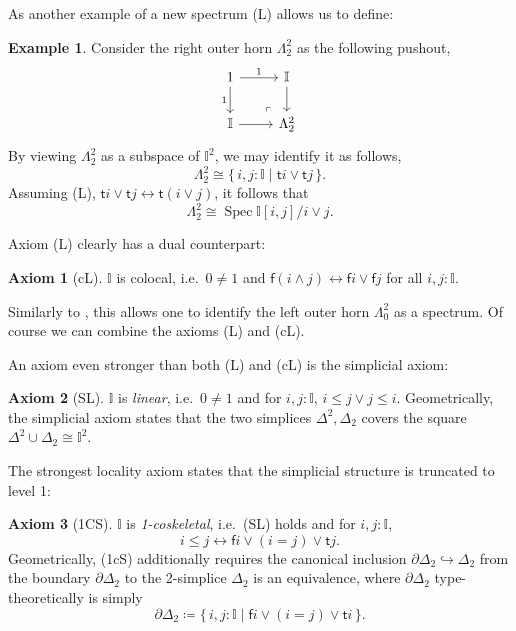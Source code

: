 \documentclass[12pt]{amsart}
\theoremstyle{definition}
\newtheorem{example}[theorem]{Example}
\newtheorem*{axiom}{Axiom}
\newcommand{\mbb}[1]{\mathbb{#1}}
\newcommand{\I}{\mbb I}
\newcommand{\ms}[1]{\mathsf{#1}}
\newcommand{\scomp}[2]{\{\,#1\mid#2\,\}}
\newcommand{\hook}{\hookrightarrow}
\newcommand{\eq}{\leftrightarrow}
\newcommand{\spec}{\operatorname{Spec}}
\begin{document}
As another example of a new spectrum (L) allows us to define:

\begin{example}\label{exm:hornaffine}
  Consider the right outer horn $\Lambda^2_2$ as the following pushout,
  \[
    \begin{tikzcd}
      1 \ar[d, "1"'] \ar[r, "1"] & \I \ar[d] \\
      \I \ar[r] & \Lambda^2_2
      \arrow["\lrcorner"{anchor=center, pos=0.125, rotate=180}, draw=none, from=2-2, to=1-1]
    \end{tikzcd}
  \]
  By viewing $\Lambda^2_2$ as a subspace of $\I^2$, we may identify it as follows,
  \[ \Lambda^2_2 \cong \scomp{i,j : \I}{\ms ti \vee \ms tj}. \]
  Assuming (L), $\ms ti \vee \ms tj \eq \ms t(i\vee j)$, it follows that 
  \[ \Lambda^2_2 \cong \spec \I[i,j]/i \vee j. \]
\end{example}

Axiom (L) clearly has a dual counterpart:

\begin{axiom}[cL]\label{ax:cL}
  $\I$ is colocal, i.e.\ $0 \neq 1$ and $\ms f(i \wedge j) \eq \ms fi \vee \ms fj$ for all $i,j : \I$.
\end{axiom}

Similarly to , this allows one to identify the left outer horn $\Lambda^2_0$ as a spectrum. Of course we can combine the axioms (L) and (cL). 

An axiom even stronger than both (L) and (cL) is the simplicial axiom:

\begin{axiom}[SL]\label{ax:SL}
  $\I$ is \emph{linear}, i.e.\ $0 \neq 1$ and for $i,j : \I$, $i \le j \vee j \le i$. Geometrically, the simplicial axiom states that the two simplices $\Delta^2,\Delta_2$ covers the square $\Delta^2 \cup \Delta_2 \cong \I^2$.
\end{axiom}

The strongest locality axiom states that the simplicial structure is truncated to level 1:

\begin{axiom}[1CS]\label{ax:1cS}
  $\I$ is \emph{1-coskeletal}, i.e.\ (SL) holds and for $i,j : \I$, 
  \[ i \le j \eq \ms fi \vee (i = j)\vee \ms tj. \]
  Geometrically, (1cS) additionally requires the canonical inclusion $\partial\Delta_2 \hook \Delta_2$ from the boundary $\partial\Delta_2$ to the 2-simplice $\Delta_2$ is an equivalence, where $\partial\Delta_2$ type-theoretically is simply
  \[ \partial\Delta_2 \coloneq \scomp{i,j : \I}{\ms fi \vee (i = j) \vee \ms ti}. \]
\end{axiom}
\end{document}
